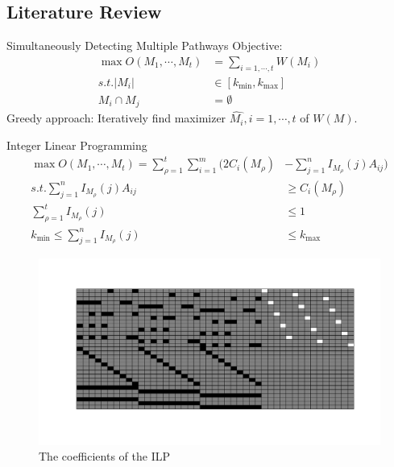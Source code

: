 \documentclass[xcolor=dvipsnames]{beamer}
\begin{document}
\subsection{Literature Review}
\begin{frame}{Simultaneously Detecting Multiple Pathways}
Objective:
\begin{displaymath}
\begin{split}
\max O(M_1,\cdots,M_t)&=\sum_{i=1,\cdots,t} W(M_i)\\
s.t. |M_i|&\in[k_{\min},k_{\max}]\\
M_i\cap M_j&=\emptyset
\end{split}
\end{displaymath}
Greedy approach: Iteratively find maximizer $\hat{M_i},i=1,\cdots,t$ of $W(M)$.
\end{frame}
\begin{frame}{Integer Linear Programming}
\begin{displaymath}
\begin{split}
\max O(M_1,\cdots,M_t)=\sum_{\rho=1}^t\sum_{i=1}^m(2C_i(M_{\rho})&-\sum_{j=1}^nI_{M_{\rho}}(j)A_{ij})\\
s.t. \sum_{j=1}^nI_{M_{\rho}}(j)A_{ij}&\geqslant C_i(M_{\rho})\\
\sum_{\rho=1}^tI_{M_{\rho}}(j)&\leqslant 1\\
k_{\min}\leqslant \sum_{j=1}^nI_{M_{\rho}}(j)&\leqslant k_{\max}
\end{split}
\end{displaymath}
\end{frame}
\begin{frame}
\begin{figure}
\centering
\includegraphics[width=0.9\linewidth]{ILP.png}
\caption{The coefficients of the ILP}
\end{figure}
\end{frame}
\end{document}

